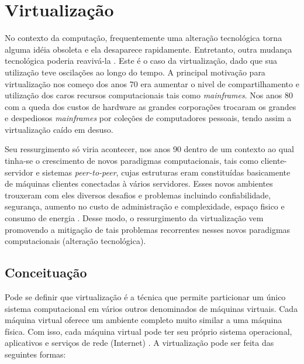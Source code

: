 \chapter{Virtualização}
\label{cap:referencial_teorico}
No contexto da computação, frequentemente uma alteração tecnológica torna alguma idéia obsoleta e ela desaparece rapidamente. Entretanto, outra mudança tecnológica poderia reavivá-la \cite{tanembaum}. Este é o caso da virtualização, dado que sua utilização teve oscilações ao longo do tempo. A principal motivação para virtualização nos começo dos anos 70 era aumentar o nivel de compartilhamento e utilização dos caros recursos computacionais tais como \textit{mainframes}\cite{menasce}. Nos anos 80 com a queda dos custos de hardware as grandes corporações trocaram os grandes e despediosos \textit{mainframes} por coleções de computadores pessoais, tendo assim a virtualização caído em desuso.

 Seu ressurgimento só viria acontecer, nos anos 90 dentro de um contexto ao qual tinha-se o crescimento de novos paradigmas computacionais, tais como cliente-servidor  e sistemas \textit{peer-to-peer}, cujas estruturas eram constituídas basicamente de máquinas clientes conectadas à vários servidores. Esses novos ambientes trouxeram com eles diversos desafios e problemas incluindo confiabilidade, segurança, aumento no custo de administração e complexidade, espaço fisico e consumo de energia \cite{menasce}. Desse modo, o ressurgimento da virtualização vem promovendo a mitigação de tais problemas recorrentes nesses novos paradigmas computacionais (alteração tecnológica).
 
\section{Conceituação} 
Pode se definir que virtualização é a técnica que permite particionar um único sistema computacional em vários outros denominados de máquinas virtuais. Cada máquina virtual oferece um ambiente completo muito similar a uma máquina física. Com isso, cada máquina virtual pode ter seu próprio sistema operacional, aplicativos e serviços de rede (Internet) \cite{carissimi}. A virtualização pode ser feita das seguintes formas:

